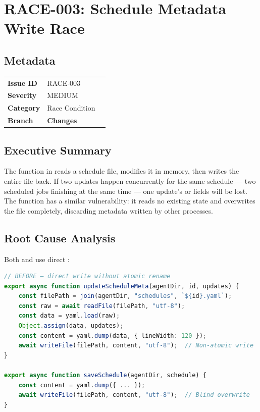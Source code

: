 \section{RACE-003: Schedule Metadata Write Race}
\label{sec:race-003}
\subsection*{Metadata}
\begin{tabular}{ll}
\textbf{Issue ID} & RACE-003 \\
\textbf{Severity} & MEDIUM \\
\textbf{Category} & Race Condition \\
\textbf{Branch} & 
\textbf{Changes} &  \\
\end{tabular}

\subsection*{Executive Summary}
The  function in  reads a schedule file, modifies it in memory, then writes the entire file back. If two updates happen concurrently for the same schedule — two scheduled jobs finishing at the same time — one update's  or  fields will be lost. The  function has a similar vulnerability: it reads no existing state and overwrites the file completely, discarding metadata written by other processes.

\subsection*{Root Cause Analysis}
Both  and  use direct :

\begin{lstlisting}[language=TypeScript]
// BEFORE — direct write without atomic rename
export async function updateScheduleMeta(agentDir, id, updates) {
    const filePath = join(agentDir, "schedules", `${id}.yaml`);
    const raw = await readFile(filePath, "utf-8");
    const data = yaml.load(raw);
    Object.assign(data, updates);
    const content = yaml.dump(data, { lineWidth: 120 });
    await writeFile(filePath, content, "utf-8");  // Non-atomic write
}

export async function saveSchedule(agentDir, schedule) {
    const content = yaml.dump({ ... });
    await writeFile(filePath, content, "utf-8");  // Blind overwrite
}
\end{lstlisting}

